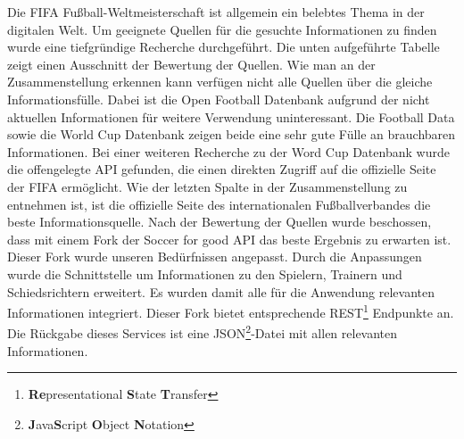 \documentclass[runningheads,a4paper]{llncs}
\begin{document}
Die FIFA Fußball-Weltmeisterschaft ist allgemein ein belebtes Thema in der digitalen Welt. Um geeignete Quellen für die gesuchte Informationen zu finden wurde eine tiefgründige Recherche durchgeführt. Die unten aufgeführte Tabelle zeigt einen Ausschnitt der Bewertung der Quellen. Wie man an der Zusammenstellung erkennen kann verfügen nicht alle Quellen über die gleiche Informationsfülle. Dabei ist die Open Football Datenbank aufgrund der nicht aktuellen Informationen für weitere Verwendung uninteressant. Die Football Data sowie die World Cup Datenbank zeigen beide eine sehr gute Fülle an brauchbaren Informationen. Bei einer weiteren Recherche zu der Word Cup Datenbank wurde die offengelegte API gefunden, die einen direkten Zugriff auf die offizielle Seite der FIFA ermöglicht. Wie der letzten Spalte in der Zusammenstellung zu entnehmen ist, ist die offizielle Seite des internationalen Fußballverbandes die beste Informationsquelle. 
Nach der Bewertung der Quellen wurde beschossen, dass mit einem Fork der Soccer for good API das beste Ergebnis zu erwarten ist. Dieser Fork wurde unseren Bedürfnissen angepasst. Durch die Anpassungen wurde die Schnittstelle um Informationen zu den Spielern, Trainern und Schiedsrichtern erweitert. Es wurden damit alle für die Anwendung relevanten Informationen  integriert. Dieser Fork bietet entsprechende REST\footnote{\textbf{Re}presentational \textbf{S}tate \textbf{T}ransfer} Endpunkte an. Die Rückgabe dieses Services ist eine JSON\footnote{\textbf{J}ava\textbf{S}cript \textbf{O}bject \textbf{N}otation}-Datei mit allen relevanten Informationen. \\
\end{document}
